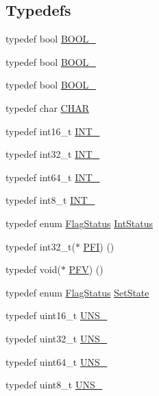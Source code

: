 \subsection*{Typedefs}
\begin{DoxyCompactItemize}
\item 
typedef bool \hyperlink{group__LPC__Types__Public__Types_ga586a49bf86982ab05295515d1e4e35fe}{B\+O\+O\+L\+\_}
\item 
typedef bool \hyperlink{group__LPC__Types__Public__Types_gab02ba567b91b6b3d3c0c0209b2f577a0}{B\+O\+O\+L\+\_}
\item 
typedef bool \hyperlink{group__LPC__Types__Public__Types_ga7cc7a8cc54a0a73fbfcc1eb0b792148d}{B\+O\+O\+L\+\_}
\item 
typedef char \hyperlink{group__LPC__Types__Public__Types_gaebb9e13210d88d43e32e735ada43a425}{C\+H\+AR}
\item 
typedef int16\+\_\+t \hyperlink{group__LPC__Types__Public__Types_gaae6e34a91bf60db05de64de7720df9a5}{I\+N\+T\+\_}
\item 
typedef int32\+\_\+t \hyperlink{group__LPC__Types__Public__Types_ga3a17614f3a1b67eaf20781d8ec16a652}{I\+N\+T\+\_}
\item 
typedef int64\+\_\+t \hyperlink{group__LPC__Types__Public__Types_ga1a0aab29eee6b306564084e005fa5750}{I\+N\+T\+\_}
\item 
typedef int8\+\_\+t \hyperlink{group__LPC__Types__Public__Types_gac172005ce53b001f50a677cc10bd17b0}{I\+N\+T\+\_}
\item 
typedef enum \hyperlink{group__LPC__Types__Public__Types_ga89136caac2e14c55151f527ac02daaff}{Flag\+Status} \hyperlink{group__LPC__Types__Public__Types_gab7d263072f745b4f3913fb0afc434c4e}{Int\+Status}
\item 
typedef int32\+\_\+t($\ast$ \hyperlink{group__LPC__Types__Public__Types_ga5cad251913e41ad7a8c765945356ec47}{P\+FI}) ()
\item 
typedef void($\ast$ \hyperlink{group__LPC__Types__Public__Types_ga5f7b826e88ffb1fae2260abb3a75b19a}{P\+FV}) ()
\item 
typedef enum \hyperlink{group__LPC__Types__Public__Types_ga89136caac2e14c55151f527ac02daaff}{Flag\+Status} \hyperlink{group__LPC__Types__Public__Types_ga7fab312a9f10f1386a955977d2ec96fe}{Set\+State}
\item 
typedef uint16\+\_\+t \hyperlink{group__LPC__Types__Public__Types_gafce87a7f2271b2cf38d7532f157f8a50}{U\+N\+S\+\_}
\item 
typedef uint32\+\_\+t \hyperlink{group__LPC__Types__Public__Types_ga28adf5c6b1811ca447826319598d8aba}{U\+N\+S\+\_}
\item 
typedef uint64\+\_\+t \hyperlink{group__LPC__Types__Public__Types_ga2299199b92f0535ad8c2e2d8c7c7f09b}{U\+N\+S\+\_}
\item 
typedef uint8\+\_\+t \hyperlink{group__LPC__Types__Public__Types_ga7353117656180c64d2216c874998b98b}{U\+N\+S\+\_}
\end{DoxyCompactItemize}
